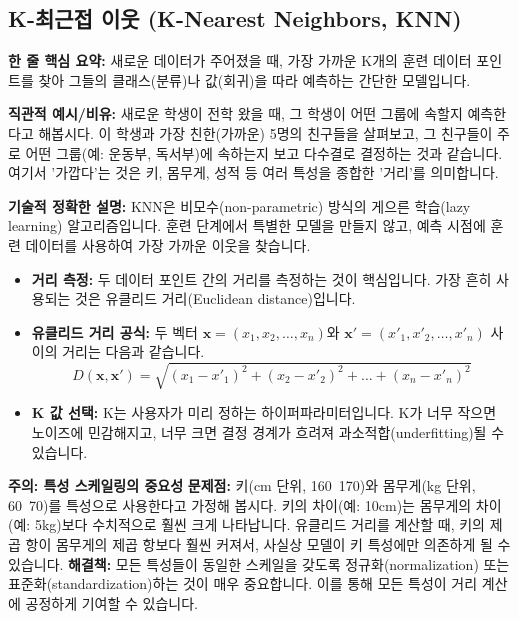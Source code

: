 \documentclass[11pt,a4paper]{article}
\begin{document}
\newpage
\subsection{K-최근접 이웃 (K-Nearest Neighbors, KNN)}

\begin{conceptbox}
\textbf{한 줄 핵심 요약:} 새로운 데이터가 주어졌을 때, 가장 가까운 K개의 훈련 데이터 포인트를 찾아 그들의 클래스(분류)나 값(회귀)을 따라 예측하는 간단한 모델입니다.
\end{conceptbox}

\textbf{직관적 예시/비유:}
새로운 학생이 전학 왔을 때, 그 학생이 어떤 그룹에 속할지 예측한다고 해봅시다. 이 학생과 가장 친한(가까운) 5명의 친구들을 살펴보고, 그 친구들이 주로 어떤 그룹(예: 운동부, 독서부)에 속하는지 보고 다수결로 결정하는 것과 같습니다. 여기서 '가깝다'는 것은 키, 몸무게, 성적 등 여러 특성을 종합한 '거리'를 의미합니다.

\textbf{기술적 정확한 설명:}
KNN은 비모수(non-parametric) 방식의 게으른 학습(lazy learning) 알고리즘입니다. 훈련 단계에서 특별한 모델을 만들지 않고, 예측 시점에 훈련 데이터를 사용하여 가장 가까운 이웃을 찾습니다.

\begin{itemize}
    \item \textbf{거리 측정:} 두 데이터 포인트 간의 거리를 측정하는 것이 핵심입니다. 가장 흔히 사용되는 것은 유클리드 거리(Euclidean distance)입니다.
    \item \textbf{유클리드 거리 공식:} 두 벡터 $\mathbf{x} = (x_1, x_2, \dots, x_n)$와 $\mathbf{x}' = (x'_1, x'_2, \dots, x'_n)$ 사이의 거리는 다음과 같습니다.
    $$ D(\mathbf{x}, \mathbf{x}') = \sqrt{(x_1 - x'_1)^2 + (x_2 - x'_2)^2 + \dots + (x_n - x'_n)^2} $$
    \item \textbf{K 값 선택:} K는 사용자가 미리 정하는 하이퍼파라미터입니다. K가 너무 작으면 노이즈에 민감해지고, 너무 크면 결정 경계가 흐려져 과소적합(underfitting)될 수 있습니다.
\end{itemize}

\begin{warningbox}
\textbf{주의: 특성 스케일링의 중요성}
\textbf{문제점:} 키(cm 단위, 160~170)와 몸무게(kg 단위, 60~70)를 특성으로 사용한다고 가정해 봅시다. 키의 차이(예: 10cm)는 몸무게의 차이(예: 5kg)보다 수치적으로 훨씬 크게 나타납니다. 유클리드 거리를 계산할 때, 키의 제곱 항이 몸무게의 제곱 항보다 훨씬 커져서, 사실상 모델이 키 특성에만 의존하게 될 수 있습니다.
\textbf{해결책:} 모든 특성들이 동일한 스케일을 갖도록 정규화(normalization) 또는 표준화(standardization)하는 것이 매우 중요합니다. 이를 통해 모든 특성이 거리 계산에 공정하게 기여할 수 있습니다.
\end{warningbox}
\end{document}
